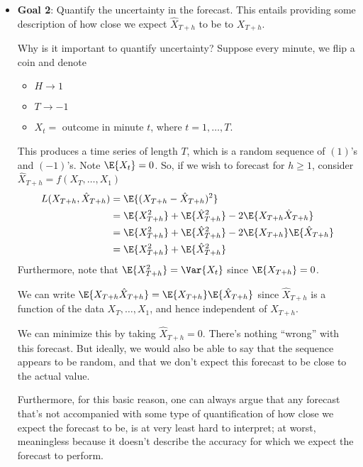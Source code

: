 \begin{itemize}
          \begin{Example}{}{}
              Most common measure $ L(\cdot,\cdot) $ is mean-squared error
              (MSE), where
              \[ L(X,Y)=\E{(X-Y)^2} \]
          \end{Example}
    \item \textbf{Goal 2}: Quantify the uncertainty in the forecast.
          This entails providing some description of how close
          we expect $ \hat{X}_{T+h} $ to be to $ X_{T+h} $.
          \begin{Example}{Why is it important to quantify uncertainty?}{}
              Suppose every minute, we flip a coin and denote
              \begin{itemize}
                  \item $ H\to 1 $
                  \item $ T\to -1 $
                  \item $ X_t= $ outcome in minute $ t $,
                        where $ t=1,\ldots,T $.
              \end{itemize}
              This produces a time series of length $ T $, which is a random
              sequence of $ (1) $'s and $ (-1) $'s. Note $ \E{X_t}=0 $.
              So, if we wish to forecast for $ h\ge 1 $,
              consider $ \hat{X}_{T+h}=f(X_T,\ldots,X_1) $
              \begin{align*}
                  L(X_{T+h},\hat{X}_{T+h})
                   & =\E{(X_{T+h}-\hat{X}_{T+h})^2}                                   \\
                   & =\E{X_{T+h}^2}+\E{\hat{X}_{T+h}^2}-2\E{X_{T+h}\hat{X}_{T+h}}     \\
                   & =\E{X_{T+h}^2}+\E{\hat{X}_{T+h}^2}-2\E{X_{T+h}}\E{\hat{X}_{T+h}} \\
                   & =\E{X_{T+h}^2}+\E{\hat{X}_{T+h}^2}
              \end{align*}
              Furthermore, note that
              $ \E{X_{T+h}^2}=\Var{X_t} $ since $ \E{X_{T+h}}=0 $.

              We can write $ \E{X_{T+h}\hat{X}_{T+h}}=\E{X_{T+h}}\E{\hat{X}_{T+h}} $ since
              $ \hat{X}_{T+h} $ is a function of the data
              $ X_T,\ldots,X_1 $, and hence independent of $ X_{T+h} $.

              We can minimize this by taking $ \hat{X}_{T+h}=0 $. There's
              nothing ``wrong'' with this forecast. But ideally,
              we would also be able to say that the sequence appears to be random,
              and that we don't expect this forecast to be close to the actual value.

                  {\color{blue}Furthermore, for this basic reason, one can always
                      argue that any forecast that's not accompanied with some
                      type of quantification of how close we expect the forecast to be,
                      is at very least hard to interpret; at worst, meaningless
                      because it doesn't
                      describe the accuracy for which we expect the forecast to perform.}
          \end{Example}
\end{itemize}
